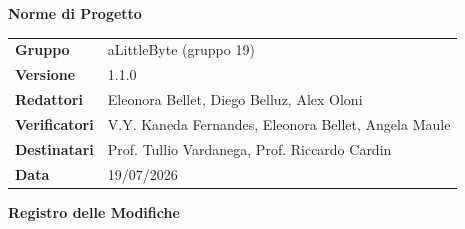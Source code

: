 \documentclass[a4paper,12pt]{article}
\begin{document}
\thispagestyle{firstpage}

\vspace*{0.5cm}

\begin{center}
    {\LARGE \textbf{Norme di Progetto}}
\end{center}

\vspace{1.5cm}

\begin{center}
    \renewcommand{\arraystretch}{1.3}
    \begin{tcolorbox}[
        width=0.92\textwidth,
        colback=gray!6,
        colframe=gray!45,
        boxrule=0.5pt,
        arc=2mm,
        boxsep=0pt,
        left=8pt, right=8pt, top=8pt, bottom=8pt
    ]
        \begin{tabularx}{\linewidth}{>{\bfseries}p{3.5cm} X}
            Gruppo      & aLittleByte (gruppo 19) \\
            Versione    & 1.1.0 \\
            Redattori   & Eleonora Bellet, Diego Belluz, Alex Oloni \\
            Verificatori& V.Y. Kaneda Fernandes, Eleonora Bellet, Angela Maule \\
            Destinatari & Prof. Tullio Vardanega, Prof. Riccardo Cardin \\
            Data        & 19/07/2026 \\
        \end{tabularx}
    \end{tcolorbox}
\end{center}

\newpage


\begin{center}
    {\Large \textbf{Registro delle Modifiche}}
\end{center}

\vspace{0.35cm}
\end{document}
